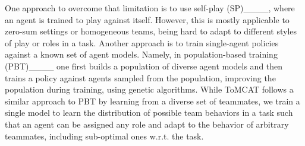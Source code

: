 
One approach to overcome that limitation is to use self-play (SP)____, where an agent is trained to play against itself. However, this is mostly applicable to zero-sum settings or homogeneous teams, being hard to adapt to different styles of play or roles in a task. Another approach is to train single-agent policies against a known set of agent models. Namely, in population-based training (PBT)____ one first builds a population of diverse agent models and then trains a policy against agents sampled from the population, improving the population during training, \eg using genetic algorithms. %
While ToMCAT follows a similar approach to PBT by learning from a diverse set of teammates, we 
train a single model to learn the distribution of possible team behaviors in a task such that an agent can be assigned any role and adapt to the behavior of arbitrary teammates, including sub-optimal ones w.r.t. the task.


